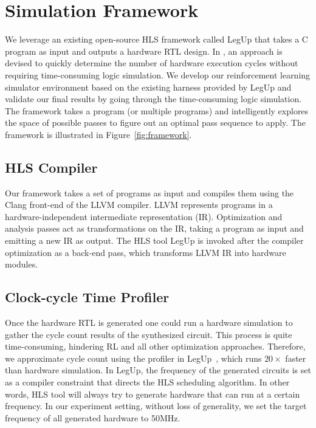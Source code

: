 \section{Simulation Framework} 
\label{sec:framework}
We leverage an existing open-source HLS framework called LegUp \cite{canis2013legup} that takes a C program as input and outputs a hardware RTL design. 
In \cite{huang2013effect}, an approach is devised to quickly determine the number of hardware execution cycles without requiring time-consuming logic simulation.
We develop our reinforcement learning simulator environment based on the existing harness provided by LegUp and  validate our final results by going through the time-consuming logic simulation. The framework takes a program (or multiple programs) and intelligently explores the space of possible passes to figure out an optimal pass sequence to apply. The framework is illustrated in Figure~\ref{fig:framework}.

\subsection{HLS Compiler}
Our framework takes a set of programs as input and compiles them using the Clang front-end of the LLVM compiler. LLVM represents programs in a hardware-independent intermediate representation (IR). Optimization and analysis passes act as transformations on the IR, taking a program as input and emitting a new IR as output. The HLS tool LegUp is invoked after the compiler optimization as a back-end pass, which transforms LLVM IR into hardware modules.

\subsection{Clock-cycle Time Profiler}
Once the hardware RTL is generated one could run a hardware simulation to gather the cycle count results of the synthesized circuit. This process is quite time-consuming, hindering RL and all other optimization approaches. Therefore, we approximate cycle count using the profiler in LegUp~\cite{huang2013effect}, which runs $20\times$ faster than hardware simulation. 
In LegUp, the frequency of the generated circuits is set as a compiler constraint that directs the HLS scheduling algorithm. In other words, HLS tool will always try to generate hardware that can run at a certain frequency. In our experiment setting, without loss of generality, we set the target frequency of all generated hardware to 50MHz.

